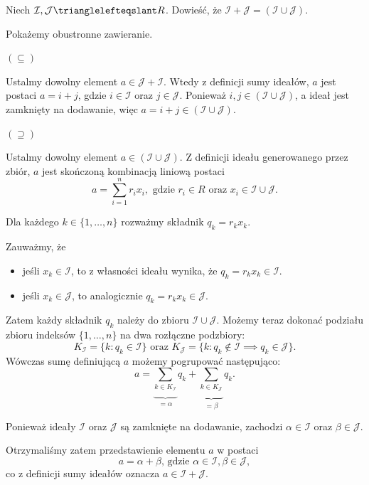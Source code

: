\begin{problem}[4]
	Niech $\mathcal{I}, \mathcal{J} \trianglelefteqslant R$. Dowieść, że $\mathcal{I} + \mathcal{J} = \left( \mathcal{I} \cup \mathcal{J} \right)$.
\end{problem} 
\begin{solution}
	Pokażemy obustronne zawieranie.

	\noindent $\bm{ \left( \subseteq  \right)  } $

	Ustalmy dowolny element $a \in \mathcal{J} + \mathcal{I}$. Wtedy z definicji sumy ideałów, $a$ jest postaci $a = i + j$, gdzie $i \in \mathcal{I}$ oraz $j \in \mathcal{J}$. Ponieważ $i,j \in \left( \mathcal{I} \cup \mathcal{J} \right) $, a ideał jest zamknięty na dodawanie, więc $a = i + j \in \left( \mathcal{I} \cup \mathcal{J} \right) $.

	\noindent $\bm{ \left( \supseteq  \right)  } $ 

	Ustalmy dowolny element $a \in \left( \mathcal{I}\cup \mathcal{J} \right) $. Z definicji ideału generowanego przez zbiór, $a$ jest skończoną kombinacją liniową postaci 
\[
	a = \sum_{i=1}^{n} r_{i}x_{i}, \text{ gdzie } r_{i} \in R \text{ oraz } x_{i} \in \mathcal{I}\cup \mathcal{J} 
.\] 

Dla każdego $k \in \{1,\ldots,n\} $ rozważmy składnik $q_{k} = r_{k}x_{k}$. 

Zauważmy, że
\begin{itemize}
	\item jeśli  $x_{k} \in \mathcal{I}$, to z własności ideału wynika, że $q_{k} = r_{k}x_{k} \in \mathcal{I}$.
	\item jeśli $x_{k} \in \mathcal{J}$, to analogicznie $q_{k} = r_{k}x_{k} \in \mathcal{J}$.
\end{itemize}

Zatem każdy składnik $q_{k}$ należy do zbioru $\mathcal{I} \cup \mathcal{J}$. Możemy teraz dokonać podziału zbioru indeksów $\{1,\ldots,n\} $ na dwa rozłączne podzbiory:
\[
K_{\mathcal{I}} = \{k : q_{k} \in \mathcal{I}\} \text{ oraz } K_{\mathcal{J}} = \{k : q_{k} \not\in \mathcal{I} \implies q_{k} \in \mathcal{J}\} 
.\] 
Wówczas sumę definiującą $a$ możemy pogrupować następująco:
\[
a = \underbrace{\sum_{k \in K_{\mathcal{I}}}}_{= \alpha } q_{k} + \underbrace{\sum_{k \in K_{\mathcal{J}}}}_{= \beta } q_{k}
.\] 

Ponieważ ideały $\mathcal{I}$ oraz $\mathcal{J}$ są zamknięte na dodawanie, zachodzi $\alpha \in \mathcal{I}$ oraz $\beta \in \mathcal{J}$.

Otrzymaliśmy zatem przedstawienie elementu $a$ w postaci
 \[
a = \alpha + \beta \text{, gdzie } \alpha \in \mathcal{I}, \beta \in \mathcal{J}
,\] 
co z definicji sumy ideałów oznacza $a \in \mathcal{I} + \mathcal{J}$.
\end{solution}
